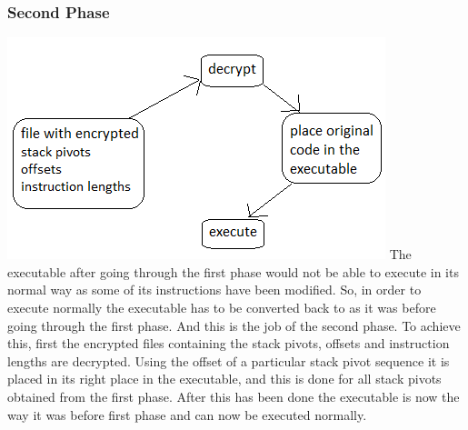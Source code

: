 \documentclass{article}
\begin{document}
\begin{multicols}{2}
	\subsubsection{Second Phase}
	\includegraphics[scale=.5]{phase2.png}
	The executable after going through the first phase would not be able to execute in its normal way as some of its instructions have been modified. So, in order to execute normally the executable has to be converted back to as it was before going through the first phase. And this is the job of the second phase. To achieve this, first the encrypted files containing the stack pivots, offsets and instruction lengths are decrypted. Using the offset of a particular stack pivot sequence it is placed in its right place in the executable, and this is done for all stack pivots obtained from the first phase. After this has been done the executable is now the way it was before first phase and can now be executed normally.
	

\end{multicols}
\end{document}
